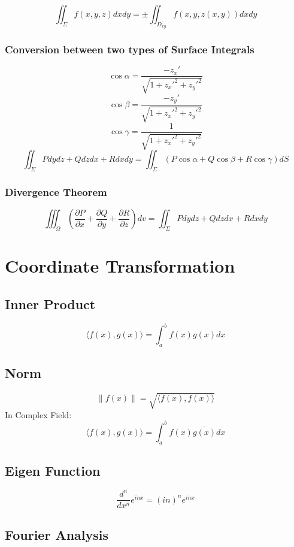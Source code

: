 \documentclass{article}
\begin{document}
\[
    \iint_\Sigma f(x, y, z) dx dy = \pm \iint_{D_{xy}} f(x, y, z(x, y)) dx dy
\]

\subsubsection{Conversion between two types of Surface Integrals}

\[
    \cos \alpha = \frac{-z_x'}{\sqrt{1 + z_x'^2 + z_y'^2}}
\]
\[
    \cos \beta = \frac{-z_y'}{\sqrt{1 + z_x'^2 + z_y'^2}}
\]
\[
    \cos \gamma = \frac{1}{\sqrt{1 + z_x'^2 + z_y'^2}}
\]
\[
    \iint_\Sigma P dy dz + Q dz dx + R dx dy = \iint_\Sigma (P \cos \alpha + Q \cos \beta + R \cos \gamma) dS
\]

\subsubsection{Divergence Theorem}

\[
    \iiint_\Omega \left(\frac{\partial P}{\partial x} + \frac{\partial Q}{\partial y} + \frac{\partial R}{\partial z}\right) dv = \iint_\Sigma P dy dz + Q dz dx + R dx dy
\]

\newpage
\section{Coordinate Transformation}

\subsection{Inner Product}

\[
    \langle f(x), g(x) \rangle = \int_a^b f(x) g(x) dx
\]

\subsection{Norm}

\[
    \|f(x)\| = \sqrt{\langle f(x), f(x) \rangle}
\]
In Complex Field:
\[
    \langle f(x), g(x) \rangle = \int_a^b f(x) \overline{g(x)} dx
\]

\subsection{Eigen Function}

\[
    \frac{d^n}{dx^n} e^{inx} = (in)^n e^{inx}
\]

\subsection{Fourier Analysis}
\end{document}
